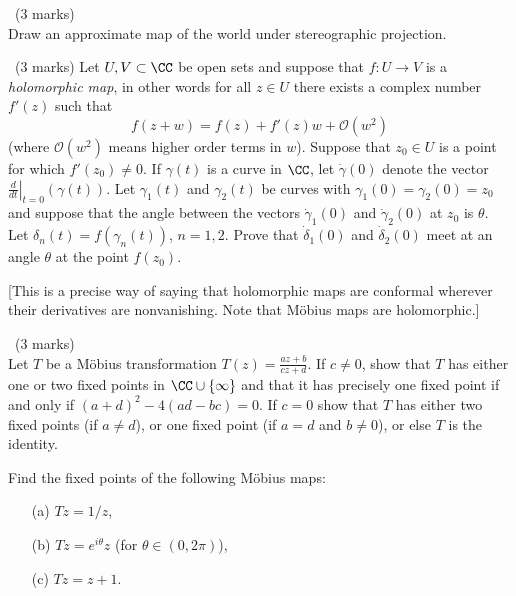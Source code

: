 \documentclass[12pt]{article}
\begin{document}
\newpage

\begin{question}\ (3 marks)\\
Draw an approximate map of the world under stereographic projection.
\end{question}

\iffalse
\begin{answer}

\end{answer}
\newpage
\fi

\vspace{1cm}

\begin{question}\ (3 marks)
  Let $U,V\subset\CC$ be open sets and suppose that $f\colon U\to V$ is a {\em holomorphic map}, in other words for all $z\in U$ there exists a complex number $f'(z)$ such that
  \[f(z+w)=f(z)+f'(z)w+\mathcal{O}(w^2)\]
  (where $\mathcal{O}(w^2)$ means higher order terms in $w$). Suppose that $z_0\in U$ is a point for which $f'(z_0)\neq 0$. If $\gamma(t)$ is a curve in $\CC$, let $\dot{\gamma}(0)$ denote the vector $\left.\frac{d}{dt}\right|_{t=0}(\gamma(t))$. Let $\gamma_1(t)$ and $\gamma_2(t)$ be curves with $\gamma_1(0)=\gamma_2(0)=z_0$ and suppose that the angle between the vectors $\dot{\gamma}_1(0)$ and $\dot{\gamma}_2(0)$ at $z_0$ is $\theta$. Let $\delta_n(t)=f(\gamma_n(t))$, $n=1,2$. Prove that $\dot{\delta}_1(0)$ and $\dot{\delta}_2(0)$ meet at an angle $\theta$ at the point $f(z_0)$.

  [This is a precise way of saying that holomorphic maps are conformal wherever their derivatives are nonvanishing. Note that M\"obius maps are holomorphic.]
\end{question}

\iffalse
\begin{answer}
  We have $f'(z_0)=re^{i\theta}$. By the chain rule, $\left.\frac{d}{dt}\right|_{t=0}f(\gamma(t))=f'(z_0)\dot{\gamma}(0)$, i.e. $\dot{\gamma}(0)$ is rotated by $\theta$ and rescaled by $r$. Similarly for $\dot{\delta}(0)$. Since both vectors are rotated by $\theta$, the angle between them is unchanged.
\end{answer}
\newpage
\fi

\vspace{1cm}

\begin{question}\ (3 marks)\\
  Let $T$ be a M\"obius transformation $T(z)=\frac{az+b}{cz+d}$. If $c\neq 0$, show that $T$ has either one or two fixed points in $\CC\cup\{\infty\}$ and that it has precisely one fixed point if and only if $(a+d)^2-4(ad-bc)=0$. If $c=0$ show that $T$ has either two fixed points (if $a\neq d$), or one fixed point (if $a=d$ and $b\neq 0$), or else $T$ is the identity.

  Find the fixed points of the following M\"obius maps:
  \begin{enumerate}
  \item[(a)] $Tz=1/z$,
  \item[(b)] $Tz=e^{i\theta}z$ (for $\theta\in(0,2\pi)$),
  \item[(c)] $Tz=z+1$.
  \end{enumerate}
\end{question}
\end{document}
